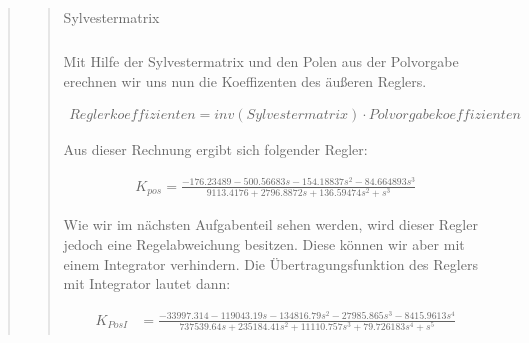\begin{quote}
\begin{quote}
\begin{table}[H]
\begin{tabular}{c c c c c c c c}
        \end{tabular}
        \caption{Sylvestermatrix}
        \end{table} 
         
         Mit Hilfe der Sylvestermatrix und den Polen aus der Polvorgabe erechnen wir uns nun die Koeffizenten des
         äußeren Reglers.
         
         \begin{equation*}
        	\begin{split}
        		Reglerkoeffizienten = inv(Sylvestermatrix) \cdot Polvorgabekoeffizienten
        	\end{split}
        \end{equation*}
                
        
        Aus dieser Rechnung ergibt sich folgender Regler:
        
        \begin{equation*}
        	\begin{split}
        		K_{pos} = \frac{- 176.23489 - 500.56683s - 154.18837s^2 - 84.664893s^3 }{9113.4176 + 2796.8872s + 136.59474s^2
        		+ s^3 }
        	\end{split}
        \end{equation*}
        
        Wie wir im nächsten Aufgabenteil sehen werden, wird dieser Regler jedoch eine Regelabweichung besitzen. Diese
        können wir aber mit einem Integrator verhindern. Die Übertragungsfunktion des Reglers mit Integrator lautet
        dann:
        
        \begin{equation*}
        	\begin{split}
        		K_{PosI} &= \frac{- 33997.314 - 119043.19s - 134816.79s^2 - 27985.865s^3 - 8415.9613s^4 }{737539.64s +
        		         235184.41s^2 + 11110.757s^3 + 79.726183s^4 + s^5 }
        	\end{split}
        \end{equation*}
    \end{quote}  %
        

\end{quote}
